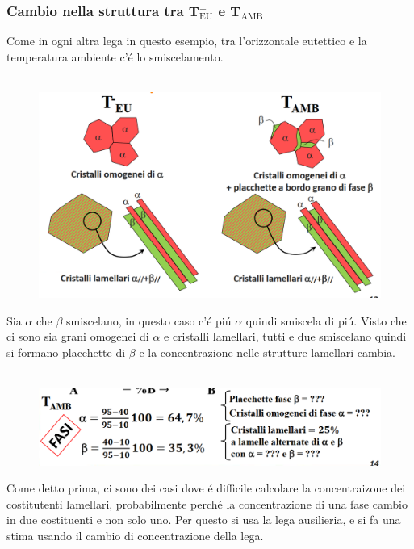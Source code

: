 \documentclass{article}
\begin{document}
{            \subsubsection{Cambio nella struttura tra T$^-_\text{EU}$ e T$_\text{AMB}$}
                Come in ogni altra lega in questo esempio, tra l'orizzontale eutettico e la temperatura ambiente c'\'e lo smiscelamento.\\ \\
                \begin{figure}[h!]
                    \centering
                    \includegraphics[width=.8\linewidth]{Diagramma di smiscelamento per lega ipoeutettica fuori da campo .png}
                \end{figure}
                Sia $\alpha$ che $\beta$ smiscelano, in questo caso c'\'e pi\'u $\alpha$ quindi smiscela di pi\'u. Visto che ci sono sia grani omogenei di $\alpha$ e cristalli lamellari, tutti e due smiscelano quindi si formano placchette di $\beta$ e la concentrazione nelle strutture lamellari cambia.\\ \\
                \begin{figure}[h!]
                    \centering
                    \includegraphics[width=.8\linewidth]{Calcolo per lega ipoeutettica fuori dal campo a TAMB senza risposte.png}
                \end{figure}
                Come detto prima, ci sono dei casi dove \'e difficile calcolare la concentraizone dei costitutenti lamellari, probabilmente perch\'e la concentrazione di una fase cambio in due costituenti e non solo uno. Per questo si usa la lega ausilieria, e si fa una stima usando il cambio di concentrazione della lega.\\ \\
}
\end{document}
